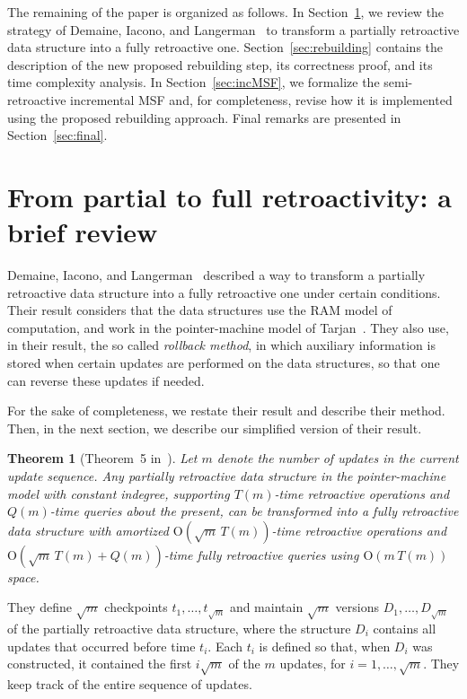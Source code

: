 \documentclass[reqno,11pt]{amsart}
\newtheorem{theorem}              {Theorem}[section]
\newcommand{\Oh}{\mathrm{O}}
\begin{document}
The remaining of the paper is organized as follows. 
In Section~\ref{sec:review}, we review the strategy of Demaine, Iacono, and 
Langerman~\cite{DemaineIL2007} to transform a partially retroactive data structure 
into a fully retroactive one.
Section~\ref{sec:rebuilding} contains the description of the new proposed rebuilding step, 
its correctness proof, and its time complexity analysis. 
In Section~\ref{sec:incMSF}, we formalize the semi-retroactive incremental MSF
and, for completeness, revise how it is implemented using the proposed rebuilding approach. 
Final remarks are presented in Section~\ref{sec:final}.

\section{From partial to full retroactivity: a brief review}\label{sec:review}

Demaine, Iacono, and Langerman~\cite{DemaineIL2007} described a way to transform 
a partially retroactive data structure into a fully retroactive one under certain conditions.
Their result considers that the data structures use the RAM model of computation, 
and work in the pointer-machine model of Tarjan~\cite{Tarjan1979}.
They also use, in their result, the so called \emph{rollback method}, in which 
auxiliary information is stored when certain updates are performed on the data
structures, so that one can reverse these updates if needed.

For the sake of completeness, we restate their result and describe their method. 
Then, in the next section, we describe our simplified version of their result. 

\begin{theorem}[Theorem~5 in~\cite{DemaineIL2007}]
  Let $m$ denote the number of updates in the current update sequence. 
  Any partially retroactive data structure in the pointer-machine model with 
  constant indegree, supporting $T(m)$-time retroactive operations and $Q(m)$-time
  queries about the present, can be transformed into a fully retroactive data
  structure with amortized $\Oh(\sqrt{m}\,T(m))$-time retroactive operations and 
  $\Oh(\sqrt{m}\,T(m)+Q(m))$-time fully retroactive queries using $\Oh(m\,T(m))$ space.
\end{theorem}

They define $\sqrt{m}$ checkpoints $t_1,\ldots,t_{\sqrt{m}}$ and maintain $\sqrt{m}$ 
versions $D_1,\ldots,D_{\sqrt{m}}$ of the partially retroactive data structure, 
where the structure $D_i$ contains all updates that occurred before time $t_i$.
Each $t_i$ is defined so that, when $D_i$ was constructed, it contained 
the first $i\sqrt{m}$ of the $m$ updates, for $i=1,\ldots,\sqrt{m}$. 
They keep track of the entire sequence of updates.
\end{document}
